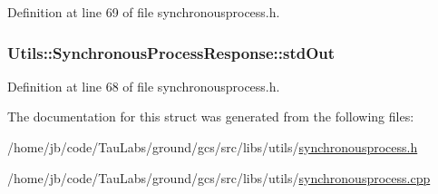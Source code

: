 \-Definition at line 69 of file synchronousprocess.\-h.

\hypertarget{struct_utils_1_1_synchronous_process_response_a84040de73bca35b34e0d0f0069c849b5}{
\subsubsection[{std\-Out}]{ {\bf \-Utils\-::\-Synchronous\-Process\-Response\-::std\-Out}}}\label{struct_utils_1_1_synchronous_process_response_a84040de73bca35b34e0d0f0069c849b5}


\-Definition at line 68 of file synchronousprocess.\-h.



\-The documentation for this struct was generated from the following files\-:\begin{DoxyCompactItemize}
\item 
/home/jb/code/\-Tau\-Labs/ground/gcs/src/libs/utils/\hyperlink{synchronousprocess_8h}{synchronousprocess.\-h}\item 
/home/jb/code/\-Tau\-Labs/ground/gcs/src/libs/utils/\hyperlink{synchronousprocess_8cpp}{synchronousprocess.\-cpp}\end{DoxyCompactItemize}
